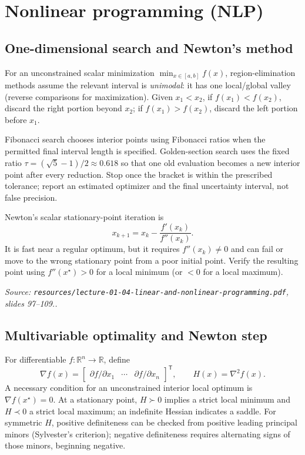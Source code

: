 \documentclass[11pt,a4paper]{article}
\renewcommand{\texttt}[1]{\nolinkurl{#1}}
\newcommand{\R}{\mathbb{R}}
\newcommand{\T}{\mathsf{T}}
\newcommand{\source}[1]{\par\smallskip\noindent\textit{Source: #1.}\par\smallskip}
\begin{document}
\section{Nonlinear programming (NLP)}
\subsection{One-dimensional search and Newton's method}
For an unconstrained scalar minimization $\min_{x\in[a,b]}f(x)$, region-elimination methods assume the relevant interval is \emph{unimodal}: it has one local/global valley (reverse comparisons for maximization). Given $x_1<x_2$, if $f(x_1)<f(x_2)$, discard the right portion beyond $x_2$; if $f(x_1)>f(x_2)$, discard the left portion before $x_1$.

Fibonacci search chooses interior points using Fibonacci ratios when the permitted final interval length is specified. Golden-section search uses the fixed ratio $\tau=(\sqrt5-1)/2\approx0.618$ so that one old evaluation becomes a new interior point after every reduction. Stop once the bracket is within the prescribed tolerance; report an estimated optimizer and the final uncertainty interval, not false precision.

Newton's scalar stationary-point iteration is
\[
 x_{k+1}=x_k-\frac{f'(x_k)}{f''(x_k)}.
\]
It is fast near a regular optimum, but it requires $f''(x_k)\ne0$ and can fail or move to the wrong stationary point from a poor initial point. Verify the resulting point using $f''(x^\star)>0$ for a local minimum (or $<0$ for a local maximum).
\source{\texttt{resources/lecture-01-04-linear-and-nonlinear-programming.pdf}, slides 97--109.}

\subsection{Multivariable optimality and Newton step}
For differentiable $f:\R^n\to\R$, define
\[
 \nabla f(x)=\begin{bmatrix}\partial f/\partial x_1&\cdots&\partial f/\partial x_n\end{bmatrix}^{\T},\qquad
 H(x)=\nabla^2f(x).
\]
A necessary condition for an unconstrained interior local optimum is $\nabla f(x^\star)=0$. At a stationary point, $H\succ0$ implies a strict local minimum and $H\prec0$ a strict local maximum; an indefinite Hessian indicates a saddle. For symmetric $H$, positive definiteness can be checked from positive leading principal minors (Sylvester's criterion); negative definiteness requires alternating signs of those minors, beginning negative.
\end{document}
